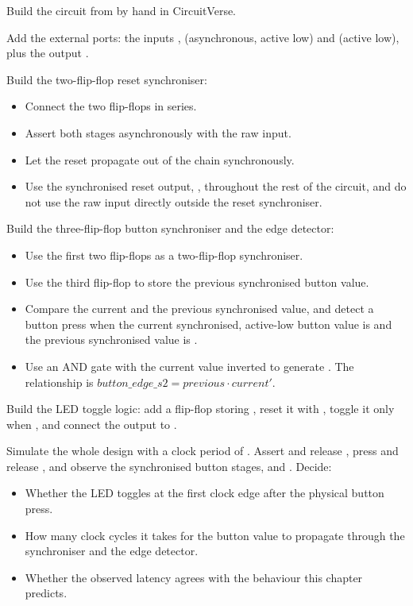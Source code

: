 
\label{c4:ex:circuit}
Build the  circuit from  by hand in CircuitVerse.

 Add the external ports: the inputs ,  (asynchronous, active
low) and  (active low), plus the output .

 Build the two-flip-flop reset synchroniser:
\begin{itemize}
  \item Connect the two flip-flops in series.
  \item Assert both stages asynchronously with the raw  input.
  \item Let the reset propagate out of the chain synchronously.
  \item Use the synchronised reset output, , throughout the rest of the circuit,
    and do not use the raw  input directly outside the reset synchroniser.
\end{itemize}

 Build the three-flip-flop button synchroniser and the edge detector:
\begin{itemize}
  \item Use the first two flip-flops as a two-flip-flop synchroniser.
  \item Use the third flip-flop to store the previous synchronised button value.
  \item Compare the current and the previous synchronised value, and detect a button press when the
    current synchronised, active-low button value is  and the previous synchronised value
    is .
  \item Use an AND gate with the current value inverted to generate . The
    relationship is $\mathit{button\_edge\_s2} = \mathit{previous} \cdot \mathit{current}'$.
\end{itemize}

 Build the LED toggle logic: add a flip-flop storing , reset it with
, toggle it only when , and connect the output 
to .

 Simulate the whole design with a clock period of . Assert and release
, press and release , and observe the synchronised button stages,
 and . Decide:
\begin{itemize}
  \item Whether the LED toggles at the first clock edge after the physical button press.
  \item How many clock cycles it takes for the button value to propagate through the synchroniser
    and the edge detector.
  \item Whether the observed latency agrees with the behaviour this chapter predicts.
\end{itemize}

